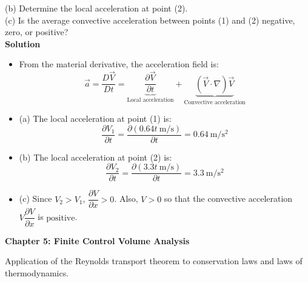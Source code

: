 ﻿\documentclass[12pt]{article}
\begin{document}
(b) Determine the local acceleration at point (2).\\
(c) Is the average convective acceleration between points (1) and (2) negative, zero, or positive?\\
\textbf{Solution}
\begin{itemize}
    \item From the material derivative, the acceleration field is:
    \[\vec{a}=\frac{D\vec{V}}{Dt}=\underbrace{\frac{\partial\vec{V}}{\partial t}}_{\text{Local acceleration}}+\underbrace{(\vec{V}\cdot\nabla)\vec{V}}_{\text{Convective acceleration}}\]
    \item (a) The local acceleration at point (1) is:
    \[\frac{\partial V_1}{\partial t}=\frac{\partial\left(0.64t\ \si{\meter\per\second}\right)}{\partial t}=\boxed{\SI{0.64}{\meter\per\second\squared}}\]
    \item (b) The local acceleration at point (2) is:
    \[\frac{\partial V_2}{\partial t}=\frac{\partial\left(3.3t\ \si{\meter\per\second}\right)}{\partial t}=\boxed{\SI{3.3}{\meter\per\second\squared}}\]
    \item (c) Since $V_2>V_1$, $\dfrac{\partial V}{\partial x}>0$. Also, $V>0$ so that the convective acceleration $V\dfrac{\partial V}{\partial x}$ is $\boxed{\text{positive}}$.
\end{itemize}
\newpage
\begin{center}
    {\LARGE\bfseries Chapter 5: Finite Control Volume Analysis\par}
\end{center}
Application of the Reynolds transport theorem to conservation laws and laws of thermodynamics.
\end{document}
